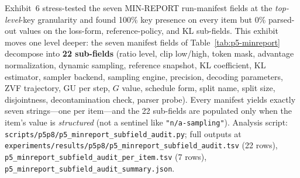 \documentclass{article}  \usepackage[preprint,nonatbib]{neurips_2026} \usepackage[numbers]{natbib}
\providecommand{\tableref}[1]{Table~\ref{#1}}
\begin{document}
Exhibit~6 stress-tested the seven MIN-REPORT run-manifest fields at the
\emph{top-level}-key granularity and found 100\% key presence on every
item but 0\% parsed-out values on the loss-form, reference-policy, and
KL sub-fields. This exhibit moves one level deeper: the seven manifest fields of
\tableref{tab:p5-minreport} decompose into \textbf{22 sub-fields}
(ratio level, clip low/high, token mask, advantage normalization, dynamic
sampling, reference snapshot, KL coefficient, KL estimator, sampler
backend, sampling engine, precision, decoding parameters, ZVF trajectory,
GU per step, $G$ value, schedule form, split name, split size,
disjointness, decontamination check, parser probe). Every manifest
yields exactly seven strings---one per item---and the 22 sub-fields are
populated only when the item's value is \emph{structured} (not a
sentinel like \texttt{"n/a-sampling"}). Analysis script:
\texttt{scripts/p5p8/p5\_minreport\_subfield\_audit.py}; full outputs at
\texttt{experiments/results/p5p8/p5\_minreport\_subfield\_audit.tsv}
(22 rows), \texttt{p5\_minreport\_subfield\_audit\_per\_item.tsv}
(7 rows), \texttt{p5\_minreport\_subfield\_audit\_summary.json}.
\end{document}
